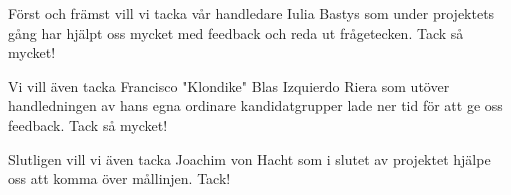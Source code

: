 Först och främst vill vi tacka vår handledare Iulia Bastys som under projektets gång har hjälpt oss mycket med feedback och reda ut frågetecken.
Tack så mycket!

Vi vill även tacka Francisco "Klondike" Blas Izquierdo Riera som utöver handledningen av hans egna ordinare kandidatgrupper lade ner tid för att ge oss feedback.
Tack så mycket!

Slutligen vill vi även tacka Joachim von Hacht som i slutet av projektet hjälpe oss att komma över mållinjen.
Tack!